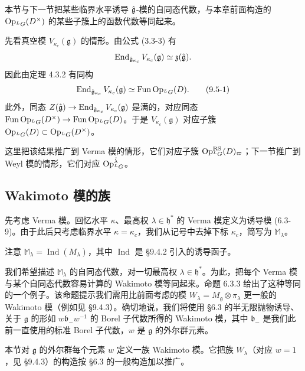 本节与下一节把某些临界水平诱导 $\hat{\mathfrak{g}}$-模的自同态代数，与本章前面构造的 $\operatorname{Op}_{{}^LG}(D^\times)$ 的某些子簇上的函数代数等同起来。

先看真空模 $V_{\kappa_c}(\mathfrak{g})$ 的情形。由公式 (3.3-3) 有
\[
    \operatorname{End}_{\hat{\mathfrak{g}}_{\kappa_c}}V_{\kappa_c}(\mathfrak{g})\simeq\mathfrak{z}(\hat{\mathfrak{g}}).
\]
因此由定理 4.3.2 有同构
\begin{equation}
    \operatorname{End}_{\hat{\mathfrak{g}}_{\kappa_c}}V_{\kappa_c}(\mathfrak{g})\simeq\operatorname{Fun}\operatorname{Op}_{{}^LG}(D).
    \tag{9.5-1}
\end{equation}
此外，同态 $Z(\hat{\mathfrak{g}})\to\operatorname{End}_{\hat{\mathfrak{g}}_{\kappa_c}}V_{\kappa_c}(\mathfrak{g})$ 是满的，对应同态 $\operatorname{Fun}\operatorname{Op}_{{}^LG}(D^\times)\to\operatorname{Fun}\operatorname{Op}_{{}^LG}(D)$。于是 $V_{\kappa_c}(\mathfrak{g})$ 对应子簇
$\operatorname{Op}_{{}^LG}(D)\subset\operatorname{Op}_{{}^LG}(D^\times)$。

这里把该结果推广到 Verma 模的情形，它们对应子簇 $\operatorname{Op}^{\mathrm{RS}}_{{}^LG}(D)_\varpi$；下一节推广到 Weyl 模的情形，它们对应 $\operatorname{Op}^{\check\lambda}_{{}^LG}$。

\subsection{Wakimoto 模的族}

先考虑 Verma 模。回忆水平 $\kappa$、最高权 $\lambda\in\mathfrak{h}^*$ 的 Verma 模定义为诱导模 (6.3-9)。由于此后只考虑临界水平 $\kappa=\kappa_c$，我们从记号中去掉下标 $\kappa_c$，简写为 $\mathbb{M}_\lambda$。

注意 $\mathbb{M}_\lambda=\operatorname{Ind}(M_\lambda)$，其中 $\operatorname{Ind}$ 是 §9.4.2 引入的诱导函子。

我们希望描述 $\mathbb{M}_\lambda$ 的自同态代数，对一切最高权 $\lambda\in\mathfrak{h}^*$。为此，把每个 Verma 模与某个自同态代数容易计算的 Wakimoto 模等同起来。命题 6.3.3 给出了这种等同的一个例子。该命题提示我们需用比前面考虑的模 $W_\lambda=M_{\mathfrak{g}}\otimes\pi_\lambda$ 更一般的 Wakimoto 模（例如见 §9.4.3）。确切地说，我们将使用 §6.3 的半无限抛物诱导、关于 $\mathfrak{g}$ 的形如 $w\mathfrak{b}_-w^{-1}$ 的 Borel 子代数所得的 Wakimoto 模，其中 $\mathfrak{b}_-$ 是我们此前一直使用的标准 Borel 子代数，$w$ 是 $\mathfrak{g}$ 的外尔群元素。

本节对 $\mathfrak{g}$ 的外尔群每个元素 $w$ 定义一族 Wakimoto 模。它把族 $W_\lambda$（对应 $w=1$，见 §9.4.3）的构造按 §6.3 的一般构造加以推广。

